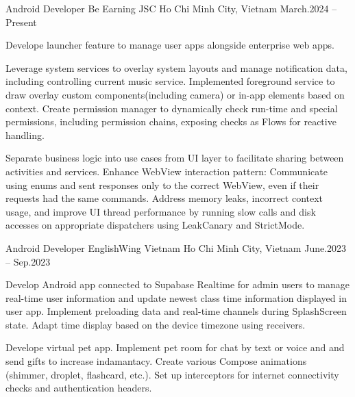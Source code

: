 \begin{cventries}

    \cventry
    {Android Developer}
    {Be Earning JSC}
    {Ho Chi Minh City, Vietnam}
    {March.2024 -- Present}
    {
        \begin{cvitems}
            \item {
                Develope launcher feature to manage user apps alongside enterprise web apps.
            }
            \item {
                Leverage system services to overlay system layouts and manage notification data, including controlling current music service.
                Implemented foreground service to draw overlay custom components(including camera) or in-app elements based on context.
                Create permission manager to dynamically check run-time and special permissions, including permission chains, exposing checks as Flows for reactive handling.
            }
            \item {
                Separate business logic into use cases from UI layer to facilitate sharing between activities and services.
                Enhance WebView interaction pattern: Communicate using enums and sent responses only to the correct WebView, even if their requests had the same commands.
                Address memory leaks, incorrect context usage, and improve UI thread performance by running slow calls and disk accesses on appropriate dispatchers using LeakCanary and StrictMode.
            }
        \end{cvitems}
    }

    \cventry
    {Android Developer}
    {EnglishWing Vietnam}
    {Ho Chi Minh City, Vietnam}
    {June.2023 -- Sep.2023}
    {
        \begin{cvitems}
            \item {
                Develop Android app connected to Supabase Realtime for admin users to manage real-time user information and update newest class time information displayed in user app.
                Implement preloading data and real-time channels during SplashScreen state.
                Adapt time display based on the device timezone using receivers.
            }
            \item {
                Develope virtual pet app.
                Implement pet room for chat by text or voice and and send gifts to increase indamantacy.
                Create various Compose animations (shimmer, droplet, flashcard, etc.).
                Set up interceptors for internet connectivity checks and authentication headers.
            }
        \end{cvitems}
    }
\end{cventries}
